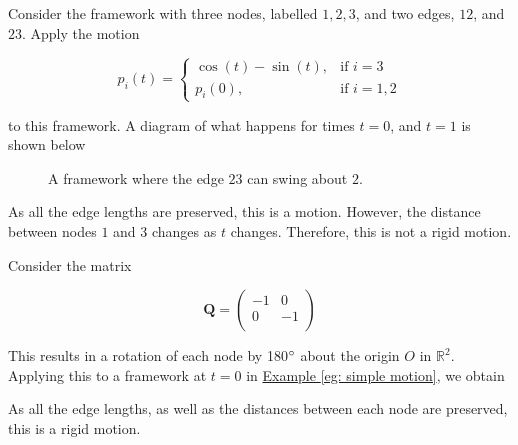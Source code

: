 \begin{example}
\label{eg: simple motion}
Consider the framework with three nodes, labelled $1,2,3$, and two edges, $12$, and $23$. Apply the motion 

\[ p_i(t) = 
\begin{cases}
    \cos(t) - \sin(t), & \text{if } i = 3 \\
    p_i(0), & \text{if } i = 1,2
\end{cases}
\]

\vspace{3 mm}
\noindent
to this framework. A diagram of what happens for times $t=0$, and $t=1$ is shown below

    \begin{figure}[htbp]
        \centering
        
        \caption{A framework where the edge $23$ can swing about $2$.}
        \label{fig: simple motion}
    \end{figure}
\vspace{-5 mm}
\begin{flushleft}
As all the edge lengths are preserved, this is a motion. However, the distance between nodes $1$ and $3$ changes as $t$ changes. Therefore, this is not a rigid motion.    
\end{flushleft}
\end{example}

\begin{example}
Consider the matrix 

\[ \mathbf{Q} = 
\begin{pmatrix}
-1 & 0\\
0 & -1\\
\end{pmatrix}
\]

\begin{flushleft}
This results in a rotation of each node by 180$\degree$ about the origin $O$ in $\mathbb{R}^2$. Applying this to a framework at $t = 0$ in \hyperref[eg: simple motion]{Example \ref*{eg: simple motion}}, we obtain

\begin{figure}[htbp]
    \centering
    
\end{figure}

As all the edge lengths, as well as the distances between each node are preserved, this is a rigid motion.    
\end{flushleft}
\end{example}

